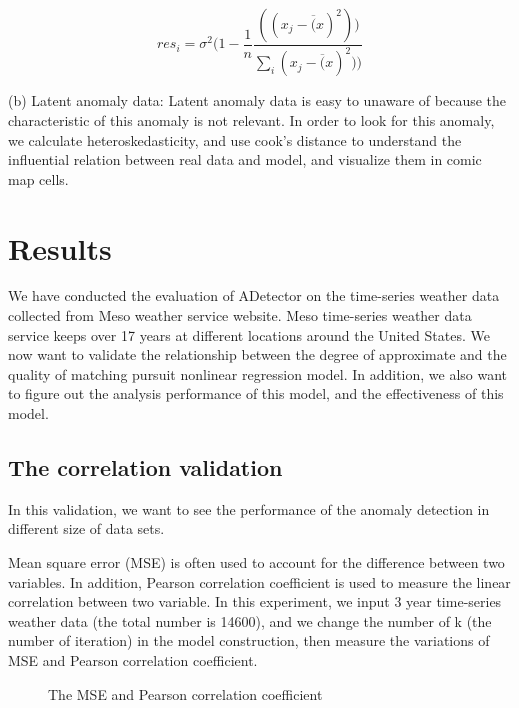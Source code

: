 \documentclass{vgtc}                          %
\begin{document}
\begin{equation}
res_i = \sigma^2 ( 1 -\frac{1}{n} \frac{((x_j - \overline(x)^2))}{\sum_i(x_j - \overline(x)^2))}
\end{equation}		 

(b) Latent anomaly data: Latent anomaly data is easy to unaware of because the characteristic of this anomaly is not relevant. In order to look for this anomaly, we calculate heteroskedasticity, and use cook's distance to understand the influential relation between real data and model, and visualize them in comic map cells. 

\section{Results}

We have conducted the evaluation of ADetector on the time-series weather data collected from Meso weather service website. Meso time-series weather data service keeps over 17 years at different locations around the United States. We now want to validate the relationship between the degree of approximate and the quality of matching pursuit nonlinear regression model. In addition, we also want to figure out the analysis performance of this model, and the effectiveness of this model.

\subsection{The correlation validation}

In this validation, we want to see the performance of the anomaly detection in different size of data sets. 

Mean square error (MSE) is often used to account for the difference between two variables. In addition, Pearson correlation coefficient is used to measure the linear correlation between two variable. In this experiment, we input 3 year time-series weather data (the total number is 14600), and we change the number of k (the number of iteration) in the model construction, then measure the variations of MSE and Pearson correlation coefficient. 
\begin{figure}[htb]
	\caption{The MSE and Pearson correlation coefficient}
	\label{fig:MSEandPearsonCorr}
\end{figure}
\end{document}
